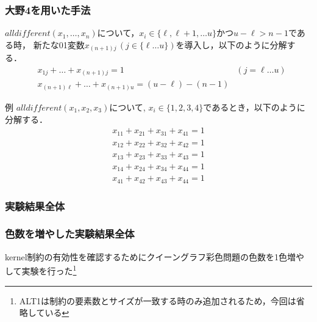 \begin{frame}
    \frametitle{大野4を用いた手法}
    \begin{block}{}
        $alldifferent(x_1,\dots,x_n)$について，$x_i \in \{\ell,\ell+1,\dots u\}$かつ$u-\ell > n-1$である時，
        新たな01変数$x_{(n+1)j}\,(j \in \{\ell \dots u\})$を導入し，以下のように分解する．
        \vspace{-3mm}
        \begin{eqnarray*}
            & x_{1j} + \dots + x_{(n+1)j} = 1 & (j=\ell \dots u)\\
            & x_{(n+1)\ell} + \dots + x_{(n+1)u} = (u-\ell)-(n-1) &
        \end{eqnarray*}
    \end{block}
    \begin{exampleblock}{例}
        $alldifferent(x_1, x_2, x_3)$について, $x_i \in \{1,2,3,4\}$であるとき，以下のように分解する．
        \vspace{-3mm}
        \begin{eqnarray*}
            x_{11} + x_{21} + x_{31} + x_{41} = 1 \\
            x_{12} + x_{22} + x_{32} + x_{42} = 1 \\
            x_{13} + x_{23} + x_{33} + x_{43} = 1 \\
            x_{14} + x_{24} + x_{34} + x_{44} = 1 \\
            x_{41} + x_{42} + x_{43} + x_{44} = 1
        \end{eqnarray*}
    \end{exampleblock}
\end{frame}



\begin{frame}
    \frametitle{実験結果全体}
    \begin{block}{}
        {\fontsize{5pt}{5pt}\selectfont }
    \end{block}
\end{frame}


\begin{frame}
    \frametitle{色数を増やした実験結果全体}
    kernel制約の有効性を確認するためにクイーングラフ彩色問題の色数を1色増やして実験を行った\footnote{ALT1は{\alldifferent}制約の要素数とサイズが一致する時のみ追加されるため，今回は省略している}
    \begin{block}{}
        {\fontsize{5pt}{5pt}\selectfont }
    \end{block}
\end{frame}


